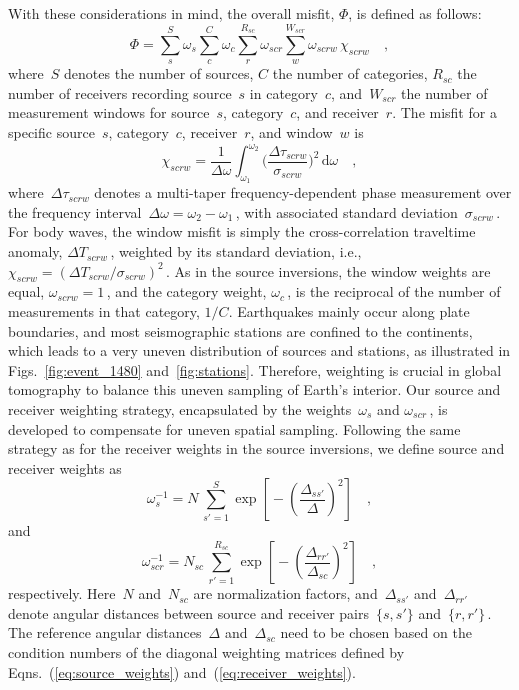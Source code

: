 \documentclass[extra,mreferee]{gji}
\begin{document}
With these considerations in mind,
the overall misfit, $\Phi$, is defined as follows:
\begin{equation}
\label{eq:misfit}
\Phi = \sum_{s}^{S} \omega_s \sum_{c}^{C} \omega_{c} \sum_{r}^{R_{sc}} \omega_{scr} \sum_{w}^{W_{scr}} \omega_{scrw}\, \chi_{scrw}
\quad ,
\end{equation}
where~$S$ denotes the number of sources, $C$ the number of categories,
$R_{sc}$ the number of receivers recording source~$s$ in category~$c$,
and~$W_{scr}$ the number of measurement windows for source~$s$, category~$c$,
and receiver~$r$.
The misfit for a specific source~$s$, category~$c$, receiver~$r$, and window~$w$ is
\begin{equation}
  \chi_{scrw} = \frac{1}{\Delta\omega}\int_{\omega_1}^{\omega_2} \Big( \frac {\Delta \tau_{scrw}} {\sigma_{scrw}} \Big)^2\, \mathrm{d}\omega
\quad ,
\end{equation}
where~$\Delta \tau_{scrw}$ denotes a multi-taper frequency-dependent phase measurement over the frequency interval~$\Delta\omega=\omega_2-\omega_1$\,,
with associated standard deviation~$\sigma_{scrw}$\,.
For body waves, the window misfit is simply the cross-correlation traveltime anomaly,
$\Delta T_{scrw}$\,, weighted by its standard deviation, i.e., $\chi_{scrw}=(\Delta T_{scrw}/\sigma_{scrw})^2$\,.
As in the source inversions,
the window weights are equal, $\omega_{scrw}=1$\,,
and the category weight, $\omega_c$\,, is the reciprocal of the number of measurements in that
category, $1/C$.
Earthquakes mainly occur along plate boundaries,
and most seismographic  stations are confined to the continents,
which leads to a very uneven distribution of sources and stations,
as illustrated in Figs.~\ref{fig:event_1480} and~\ref{fig:stations}.
Therefore, weighting is crucial in global tomography to balance this uneven sampling
of Earth's interior.
Our source and receiver weighting strategy,
encapsulated by the weights~$\omega_s$ and $\omega_{scr}$\,,
is developed to compensate for uneven spatial sampling.
Following the same strategy as for the receiver weights in the source inversions,
we define source and receiver weights as
\begin{equation}
\omega_{s}^{-1} = N\,\sum_{s'=1}^{S} \exp\left[\mbox{}-\left(\frac{\Delta_{ss'}}{\Delta}\right)^2\right]
\quad ,
\label{eq:source_weights}
\end{equation}
and
\begin{equation}
\omega_{scr}^{-1} = N_{sc}\,\sum_{r'=1}^{R_{sc}} \exp\left[\mbox{}-\left(\frac{\Delta_{rr'}}{\Delta_{sc}}\right)^2\right]
\quad ,
\label{eq:receiver_weights}
\end{equation}
respectively.
Here~$N$ and~$N_{sc}$ are normalization factors,
and~$\Delta_{ss'}$ and~$\Delta_{rr'}$ denote angular distances between source and receiver pairs~$\{s,s'\}$ and~$\{r,r'\}$\,.
The reference angular distances~$\Delta$ and~$\Delta_{sc}$ need to be chosen based on the condition 
numbers of the diagonal weighting matrices defined by Eqns.~(\ref{eq:source_weights}) and~(\ref{eq:receiver_weights}).
\end{document}
